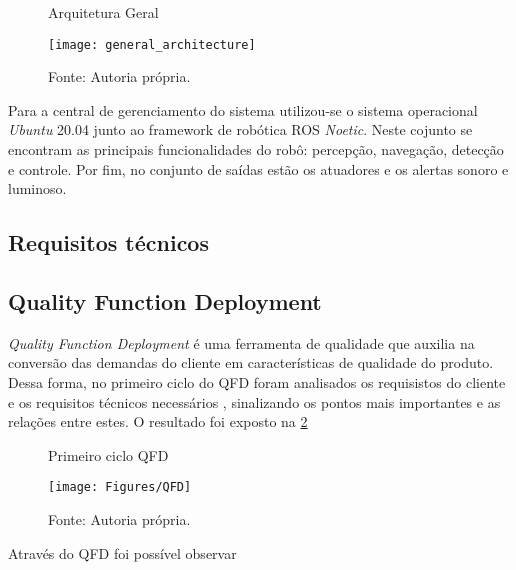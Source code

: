 \begin{figure} [h!]	
    \centering

    \caption{Arquitetura Geral}
    \texttt{[image: general\_architecture]}
    \caption*{Fonte: Autoria própria.}
    \label{fig:Arquitetura geral}
\end{figure}	

Para a central de gerenciamento do sistema utilizou-se o sistema 
operacional \textit{Ubuntu} 20.04 junto ao framework de robótica ROS 
\textit{Noetic}. Neste cojunto se encontram as principais funcionalidades 
do robô: percepção, navegação, detecção e controle. Por fim, no conjunto 
de saídas estão os atuadores e os alertas sonoro e luminoso.

\subsection{Requisitos técnicos}

\subsection{Quality Function Deployment}
\textit{Quality Function Deployment} é uma ferramenta de qualidade que 
auxilia na conversão das demandas do cliente em características de 
qualidade do produto. Dessa forma, no primeiro ciclo do QFD foram 
analisados os requisistos do cliente e os requisitos técnicos necessários
, sinalizando os pontos mais importantes e as relações entre estes. 
O resultado foi exposto na \ref{fig:QFD}

\begin{figure} [h!]	
    \centering
    \caption{ Primeiro ciclo QFD}
    \texttt{[image: Figures/QFD]}
    \caption*{Fonte: Autoria própria.}
    \label{fig:QFD}
\end{figure}
 Através do QFD foi possível observar 



